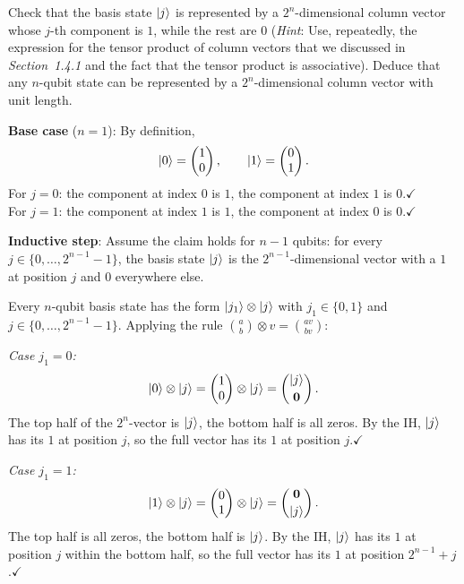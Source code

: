 \documentclass{ceri/sty/rapport}
\newcounter{exercice}[section]
\begin{document}
\begin{exercice}[p.~38]
Check that the basis state $\ket{j}$ is represented by a $2^n$-dimensional
column vector whose $j$-th component is $1$, while the rest are $0$
(\textit{Hint}: Use, repeatedly, the expression for the tensor product of
column vectors that we discussed in \textit{Section~1.4.1} and the fact that
the tensor product is associative).
Deduce that any $n$-qubit state can be represented by a $2^n$-dimensional
column vector with unit length.
\end{exercice}

\begin{solution}
\textbf{Base case} ($n=1$): By definition,
\[
  \ket{0}=\begin{pmatrix}1\\0\end{pmatrix},\qquad
  \ket{1}=\begin{pmatrix}0\\1\end{pmatrix}.
\]
For $j=0$: the component at index $0$ is $1$, the component at index $1$ is $0$.\quad$\checkmark$\\
For $j=1$: the component at index $1$ is $1$, the component at index $0$ is $0$.\quad$\checkmark$

\medskip\noindent
\textbf{Inductive step}: Assume the claim holds for $n-1$ qubits: for every
$j\in\{0,\ldots,2^{n-1}-1\}$, the basis state $\ket{j}$ is the $2^{n-1}$-dimensional
vector with a $1$ at position $j$ and $0$ everywhere else.

Every $n$-qubit basis state has the form $\ket{j_1}\otimes\ket{j}$
with $j_1\in\{0,1\}$ and $j\in\{0,\ldots,2^{n-1}-1\}$.
Applying the rule $\binom{a}{b}\otimes v=\binom{av}{bv}$:

\medskip
\textit{Case $j_1=0$:}
\[
  \ket{0}\otimes\ket{j}
  =\begin{pmatrix}1\\0\end{pmatrix}\otimes\ket{j}
  =\begin{pmatrix}\ket{j}\\[2pt]\mathbf{0}\end{pmatrix}.
\]
The top half of the $2^n$-vector is $\ket{j}$, the bottom half is all zeros.
By the IH, $\ket{j}$ has its $1$ at position $j$, so the full vector has its $1$ at position $j$.\quad$\checkmark$

\medskip
\textit{Case $j_1=1$:}
\[
  \ket{1}\otimes\ket{j}
  =\begin{pmatrix}0\\1\end{pmatrix}\otimes\ket{j}
  =\begin{pmatrix}\mathbf{0}\\[2pt]\ket{j}\end{pmatrix}.
\]
The top half is all zeros, the bottom half is $\ket{j}$.
By the IH, $\ket{j}$ has its $1$ at position $j$ within the bottom half,
so the full vector has its $1$ at position $2^{n-1}+j$.\quad$\checkmark$


\end{solution}
\end{document}
